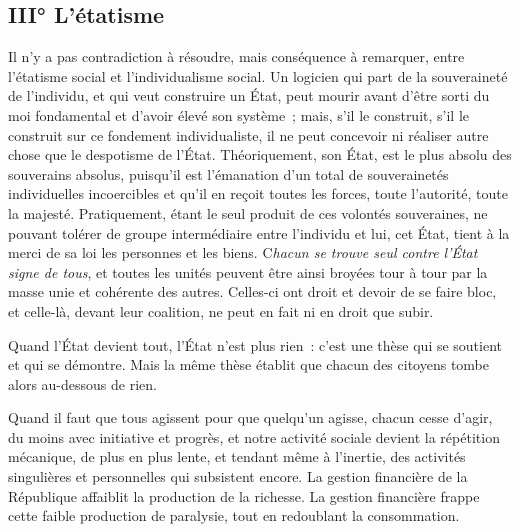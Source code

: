 \documentclass[french,twoside]{book} %
\newcommand{\astermono}{\medskip\centerline{\color{rubric}\large\selectfont{\syms ✻}}\medskip\par}%
\begin{document}
\astermono

\subsection[III° L’étatisme]{III° L’étatisme}
\noindent Il n’y a pas contradiction à résoudre, mais conséquence à remarquer, entre l’étatisme social et l’individualisme social. Un logicien qui part de la souveraineté de l’individu, et qui veut construire un État, peut mourir avant d’être sorti du moi fondamental et d’avoir élevé son système ; mais, s’il le construit, s’il le construit sur ce fondement individualiste, il ne peut concevoir ni réaliser autre chose que le despotisme de l’État. Théoriquement, son État, est le plus absolu des souverains absolus, puisqu’il est l’émanation d’un total de souverainetés individuelles incoercibles et qu’il en reçoit toutes les forces, toute l’autorité, toute la majesté. Pratiquement, étant le seul produit de ces volontés souveraines, ne pouvant tolérer de groupe intermédiaire entre l’individu et lui, cet État, tient à la merci de sa loi les personnes et les biens. C\emph{hacun se trouve seul contre l’État signe de tous}, et toutes les unités peuvent être ainsi broyées tour à tour par la masse unie et cohérente des autres. Celles-ci ont droit et devoir de se faire bloc, et celle-là, devant leur coalition, ne peut en fait ni en droit que subir.\par

\astermono

\noindent Quand l’État devient tout, l’État n’est plus rien : c’est une thèse qui se soutient et qui se démontre. Mais la même thèse établit que chacun des citoyens tombe alors au-dessous de rien.\par
Quand il faut que tous agissent pour que quelqu’un agisse, chacun cesse d’agir, du moins avec initiative et progrès, et notre activité sociale devient la répétition mécanique, de plus en plus lente, et tendant même à l’inertie, des activités singulières et personnelles qui subsistent encore. La gestion financière de la République affaiblit la production de la richesse. La gestion financière frappe cette faible production de paralysie, tout en redoublant la consommation.\par

\astermono
\end{document}
